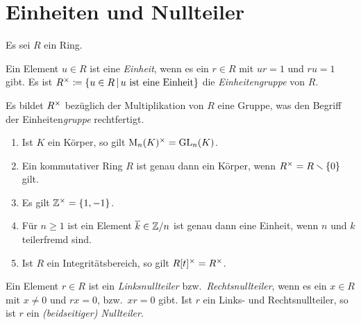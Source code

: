 \section{Einheiten und Nullteiler}

Es sei $R$ ein Ring.

\begin{definition}
  Ein Element $u \in R$ ist eine \emph{Einheit}, wenn es ein $r \in R$ mit $ur = 1$ und $ru = 1$ gibt.
  Es ist
  $
              \unitgroup{R}
    \defined  \{
                u \in R
              \suchthat 
                \text{$u$ ist eine Einheit}
              \}
  $
  die \emph{Einheitengruppe} von $R$.
\end{definition}

Es bildet $R^{\times}$ bezüglich der Multiplikation von $R$ eine Gruppe, was den Begriff der Einheiten\emph{gruppe} rechtfertigt.

\begin{example}
  \begin{enumerate}
    \item
      Ist $K$ ein Körper, so gilt $\operatorname{M}_{n}(K)^{\times} = \operatorname{GL}_{n}(K)$.
    \item
      Ein kommutativer Ring $R$ ist genau dann ein Körper, wenn $R^{\times} = R \smallsetminus \{0\}$ gilt.
    \item
      Es gilt $\mathbb{Z}^{\times} = \{1, -1\}$.
    \item
      Für $n \geq 1$ ist ein Element $\overline{k} \in \mathbb{Z}/n$ ist genau dann eine Einheit, wenn $n$ und $k$ teilerfremd sind.
    \item
      Ist $R$ ein Integritätsbereich, so gilt $R[t]^{\times} = R^{\times}$.
  \end{enumerate}
\end{example}

\begin{definition}
  Ein Element $r \in R$ ist ein \emph{Linksnullteiler} bzw.\ \emph{Rechtsnullteiler}, wenn es ein $x \in R$ mit $x \neq 0$ und $rx = 0$, bzw.\ $xr = 0$ gibt.
  Ist $r$ ein Links- und Rechtsnullteiler, so ist $r$ ein \emph{\textup(beidseitiger\textup) Nullteiler}.
\end{definition}

